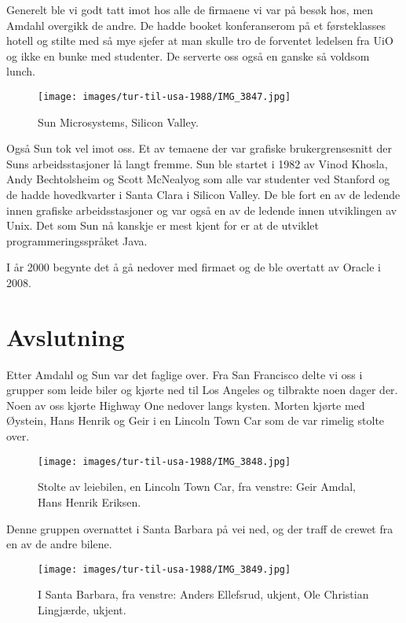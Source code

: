 Generelt ble vi godt tatt imot hos alle de firmaene vi var på besøk hos, men Amdahl overgikk de andre. De hadde booket konferanserom på et førsteklasses hotell og stilte med så mye sjefer at man skulle tro de forventet ledelsen fra UiO og ikke en bunke med studenter. De serverte oss også en ganske så voldsom lunch.

\begin{figure}
	\texttt{[image: images/tur-til-usa-1988/IMG\_3847.jpg]}
	\caption{Sun Microsystems, Silicon Valley.}
\end{figure}

Også Sun tok vel imot oss. Et av temaene der var grafiske brukergrensesnitt der Suns arbeidsstasjoner lå langt fremme. Sun ble startet i 1982 av Vinod Khosla, Andy Bechtolsheim og Scott McNealyog som alle var studenter ved Stanford og de hadde hovedkvarter i Santa Clara i Silicon Valley. De ble fort en av de ledende innen grafiske arbeidsstasjoner og var også en av de ledende innen utviklingen av Unix. Det som Sun nå kanskje er mest kjent for er at de utviklet programmeringsspråket Java.

I år 2000 begynte det å gå nedover med firmaet og de ble overtatt av Oracle i 2008.

\section{Avslutning}

Etter Amdahl og Sun var det faglige over. Fra San Francisco delte vi oss i grupper som leide biler og kjørte ned til Los Angeles og tilbrakte noen dager der. Noen av oss kjørte Highway One nedover langs kysten. Morten kjørte med Øystein, Hans Henrik og Geir i en Lincoln Town Car som de var rimelig stolte over.

\begin{figure}
	\texttt{[image: images/tur-til-usa-1988/IMG\_3848.jpg]}
	\caption{Stolte av leiebilen, en Lincoln Town Car, fra venstre: Geir Amdal, Hans Henrik Eriksen.}
\end{figure}

Denne gruppen overnattet i Santa Barbara på vei ned, og der traff de crewet fra en av de andre bilene.

\begin{figure}
	\texttt{[image: images/tur-til-usa-1988/IMG\_3849.jpg]}
	\caption{I Santa Barbara, fra venstre: Anders Ellefsrud, ukjent, Ole Christian Lingjærde, ukjent.}
\end{figure}

